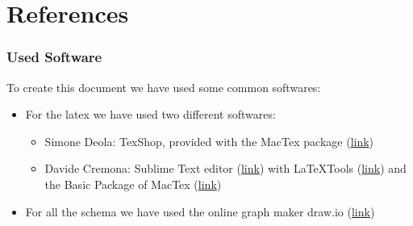 \documentclass[../../dd.tex]{subfiles}
\begin{document}
	\chapter{References}
		\subsection{Used Software}
		To create this document we have used some common softwares:
		\begin{itemize}
			\item For the latex we have used two different softwares:
			\begin{itemize}
			
			\item Simone Deola: TexShop, provided with the MacTex package 					(\href{https://tug.org/mactex/}{link})
			
		\item Davide Cremona: Sublime Text editor (\href{http://www.sublimetext.com}{link}) with LaTeXTools (\href{https://github.com/SublimeText/LaTeXTools}{link}) and the Basic Package of MacTex (\href{https://tug.org/mactex/}{link})

			\end{itemize}
			
			\item For all the schema we have used the online graph maker draw.io (\href{https://www.draw.io}{link})
		\end{itemize}
		
		
\end{document}
